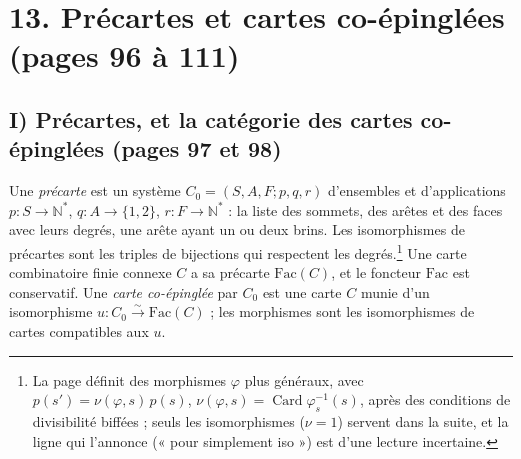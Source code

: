 \documentclass[11pt,a4paper]{article}
\begin{document}
\section*{13. Précartes et cartes co-épinglées (pages 96 à 111)}

\subsection*{I) Précartes, et la catégorie des cartes co-épinglées
(pages 97 et 98)}

Une \emph{précarte} est un système $C_{0} = (S, A, F ; p, q, r)$ d'ensembles et
d'applications $p : S \to \mathbb{N}^{*}$, $q : A \to \{1, 2\}$, $r : F \to
\mathbb{N}^{*}$ : la liste des sommets, des arêtes et des faces avec leurs
degrés, une arête ayant un ou deux brins. Les isomorphismes de précartes sont
les triples de bijections qui respectent les degrés.\footnote{La page définit
des morphismes $\varphi$ plus généraux, avec $p(s') = \nu(\varphi, s)\, p(s)$,
$\nu(\varphi, s) = \operatorname{Card} \varphi_{s}^{-1}(s)$, après des conditions
de divisibilité biffées ; seuls les isomorphismes ($\nu = 1$) servent dans la
suite, et la ligne qui l'annonce (« pour simplement iso ») est d'une lecture
incertaine.} Une carte combinatoire finie connexe $C$ a sa précarte
$\mathrm{Fac}(C)$, et le foncteur $\mathrm{Fac}$ est conservatif. Une \emph{carte
co-épinglée} par $C_{0}$ est une carte $C$ munie d'un isomorphisme $u : C_{0}
\xrightarrow{\sim} \mathrm{Fac}(C)$ ; les morphismes sont les isomorphismes de
cartes compatibles aux $u$.
\end{document}
